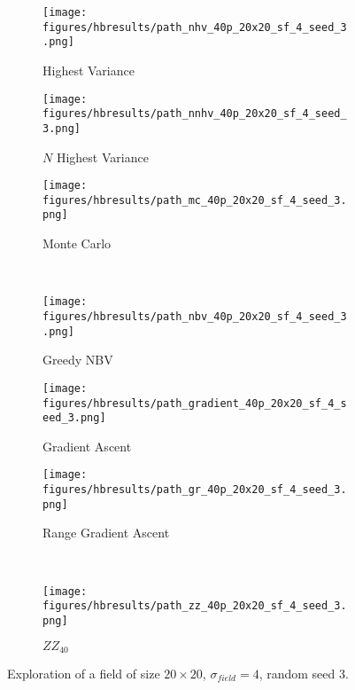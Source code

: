 \begin{figure}[htb!]
    \centering
    \begin{subfigure}[t]{0.3333\textwidth}
        \centering
        \texttt{[image: figures/hbresults/path\_nhv\_40p\_20x20\_sf\_4\_seed\_3.png]}
        \ssp
        \captionsetup{skip=0.20\baselineskip,size=footnotesize}
        \caption{Highest Variance}
    \end{subfigure}%
    \begin{subfigure}[t]{0.3333\textwidth}
        \centering
        \texttt{[image: figures/hbresults/path\_nnhv\_40p\_20x20\_sf\_4\_seed\_3.png]}
        \ssp
        \captionsetup{skip=0.20\baselineskip,size=footnotesize}
        \caption{$N$ Highest Variance}
    \end{subfigure}%
    \begin{subfigure}[t]{0.3333\textwidth}
        \centering
        \texttt{[image: figures/hbresults/path\_mc\_40p\_20x20\_sf\_4\_seed\_3.png]}
        \ssp
        \captionsetup{skip=0.20\baselineskip,size=footnotesize}
        \caption{Monte Carlo}
    \end{subfigure}%
    \\
    \begin{subfigure}[t]{0.3333\textwidth}
        \centering
        \texttt{[image: figures/hbresults/path\_nbv\_40p\_20x20\_sf\_4\_seed\_3.png]}
        \ssp
        \captionsetup{skip=0.20\baselineskip,size=footnotesize}
        \caption{Greedy NBV}
    \end{subfigure}%
    \begin{subfigure}[t]{0.3333\textwidth}
        \centering
        \texttt{[image: figures/hbresults/path\_gradient\_40p\_20x20\_sf\_4\_seed\_3.png]}
        \ssp
        \captionsetup{skip=0.20\baselineskip,size=footnotesize}
        \caption{Gradient Ascent}
    \end{subfigure}%
    \begin{subfigure}[t]{0.3333\textwidth}
        \centering
        \texttt{[image: figures/hbresults/path\_gr\_40p\_20x20\_sf\_4\_seed\_3.png]}
        \ssp
        \captionsetup{skip=0.20\baselineskip,size=footnotesize}
        \caption{Range Gradient Ascent}
    \end{subfigure}%
    \\
    \begin{subfigure}[t]{0.3333\textwidth}
        \centering
        \texttt{[image: figures/hbresults/path\_zz\_40p\_20x20\_sf\_4\_seed\_3.png]}
        \ssp
        \captionsetup{skip=0.20\baselineskip,size=footnotesize}
        \caption{$ZZ_{40}$}
    \end{subfigure}%
    \ssp
    \captionsetup{skip=0.20\baselineskip}
    \caption{Exploration of a field of size $20 \times 20$, $\sigma_{field} = 4$, random seed 3.}
    \label{fig:s3_nbvpathcomp}
\end{figure}


